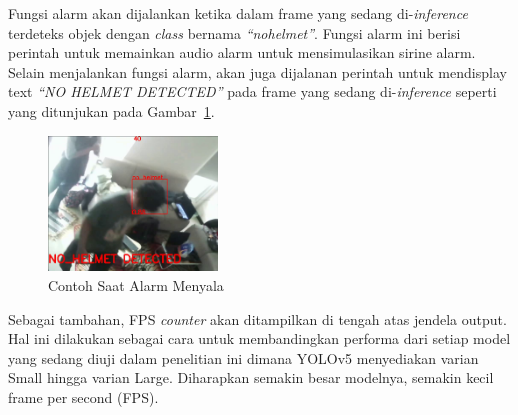 
\par Fungsi alarm akan dijalankan ketika dalam frame yang sedang di-\emph{inference} terdeteks objek dengan \emph{class} bernama \emph{“no\textunderscore helmet”}. Fungsi alarm ini berisi perintah untuk memainkan audio alarm untuk mensimulasikan sirine alarm. Selain menjalankan fungsi alarm, akan juga dijalanan perintah untuk mendisplay text \emph{“NO HELMET DETECTED”} pada frame yang sedang di-\emph{inference} seperti yang ditunjukan pada Gambar~\ref{fig:alarmtriggerexample}.

\begin{figure} [ht]
  \centering
  \includegraphics[width=0.4\textwidth]{gambar/utilities/alarm_example.png}

  \caption{Contoh Saat Alarm Menyala}
  \label{fig:alarmtriggerexample}
\end{figure}


\par Sebagai tambahan, FPS \emph{counter} akan ditampilkan di tengah atas jendela output. Hal ini dilakukan sebagai cara untuk membandingkan performa dari setiap model yang sedang diuji dalam penelitian ini dimana YOLOv5 menyediakan varian Small hingga varian Large. Diharapkan semakin besar modelnya, semakin kecil frame per second (FPS).